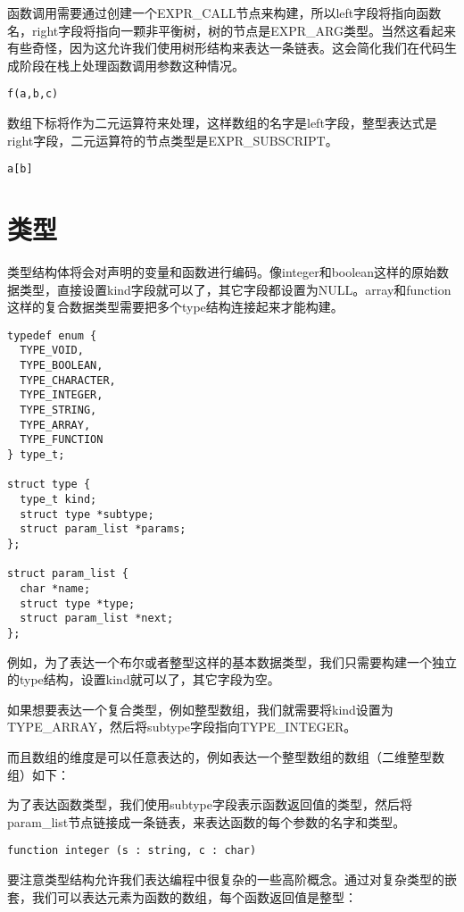 \documentclass[cn,11pt,chinese]{elegantbook}
\begin{document}
函数调用需要通过创建一个EXPR\_CALL节点来构建，所以left字段将指向函数名，right字段将指向一颗非平衡树，树的节点是EXPR\_ARG类型。当然这看起来有些奇怪，因为这允许我们使用树形结构来表达一条链表。这会简化我们在代码生成阶段在栈上处理函数调用参数这种情况。

\begin{verbatim}
f(a,b,c)
\end{verbatim}

数组下标将作为二元运算符来处理，这样数组的名字是left字段，整型表达式是right字段，二元运算符的节点类型是EXPR\_SUBSCRIPT。

\begin{verbatim}
a[b]
\end{verbatim}

\section{类型}

类型结构体将会对声明的变量和函数进行编码。像integer和boolean这样的原始数据类型，直接设置kind字段就可以了，其它字段都设置为NULL。array和function这样的复合数据类型需要把多个type结构连接起来才能构建。

\begin{verbatim}
typedef enum {
  TYPE_VOID,
  TYPE_BOOLEAN,
  TYPE_CHARACTER,
  TYPE_INTEGER,
  TYPE_STRING,
  TYPE_ARRAY,
  TYPE_FUNCTION
} type_t;

struct type {
  type_t kind;
  struct type *subtype;
  struct param_list *params;
};

struct param_list {
  char *name;
  struct type *type;
  struct param_list *next;
};
\end{verbatim}

例如，为了表达一个布尔或者整型这样的基本数据类型，我们只需要构建一个独立的type结构，设置kind就可以了，其它字段为空。

如果想要表达一个复合类型，例如整型数组，我们就需要将kind设置为TYPE\_ARRAY，然后将subtype字段指向TYPE\_INTEGER。

而且数组的维度是可以任意表达的，例如表达一个整型数组的数组（二维整型数组）如下：

为了表达函数类型，我们使用subtype字段表示函数返回值的类型，然后将param\_list节点链接成一条链表，来表达函数的每个参数的名字和类型。

\begin{verbatim}
function integer (s : string, c : char)
\end{verbatim}

要注意类型结构允许我们表达编程中很复杂的一些高阶概念。通过对复杂类型的嵌套，我们可以表达元素为函数的数组，每个函数返回值是整型：
\end{document}
